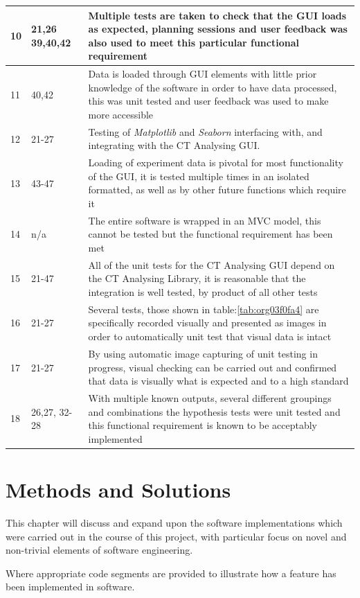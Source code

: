 \documentclass[11pt]{report}
\begin{document}
\begin{longtable}{|l|l|p{14cm}|}
\hline
10 & 21,26 39,40,42 & Multiple tests are taken to check that the GUI loads as expected, planning sessions and user feedback was also used to meet this particular functional requirement\\
\hline
11 & 40,42 & Data is loaded through GUI elements with little prior knowledge of the software in order to have data processed, this was unit tested and user feedback was used to make more accessible\\
\hline
12 & 21-27 & Testing of \emph{Matplotlib} and \emph{Seaborn} interfacing with, and integrating with the CT Analysing GUI.\\
\hline
13 & 43-47 & Loading of experiment data is pivotal for most functionality of the GUI, it is tested multiple times in an isolated formatted, as well as by other future functions which require it\\
\hline
14 & n/a & The entire software is wrapped in an MVC model, this cannot be tested but the functional requirement has been met\\
\hline
15 & 21-47 & All of the unit tests for the CT Analysing GUI depend on the CT Analysing Library, it is reasonable that the integration is well tested, by product of all other tests\\
\hline
16 & 21-27 & Several tests, those shown in table:\ref{tab:org03f0fa4} are specifically recorded visually and presented as images in order to automatically unit test that visual data is intact\\
\hline
17 & 21-27 & By using automatic image capturing of unit testing in progress, visual checking can be carried out and confirmed that data is visually what is expected and to a high standard\\
\hline
18 & 26,27, 32-28 & With multiple known outputs, several different groupings and combinations the hypothesis tests were unit tested and this functional requirement is known to be acceptably implemented\\
\hline
\end{longtable}

\chapter{Methods and Solutions}
\label{sec:org421f162}
This chapter will discuss and expand upon the software implementations which were carried out in the course of this project, with particular focus on novel and non-trivial elements of software engineering.

Where appropriate code segments are provided to illustrate how a feature has been implemented in software.
\end{document}
